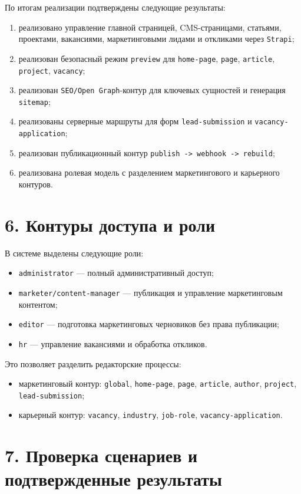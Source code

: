 \documentclass[12pt,a4paper]{article}
\begin{document}
По итогам реализации подтверждены следующие результаты:
\begin{enumerate}
  \item реализовано управление главной страницей, CMS-страницами, статьями, проектами,
  вакансиями, маркетинговыми лидами и откликами через \texttt{Strapi};
  \item реализован безопасный режим \texttt{preview} для \texttt{home-page}, \texttt{page},
  \texttt{article}, \texttt{project}, \texttt{vacancy};
  \item реализован \texttt{SEO/Open Graph}-контур для ключевых сущностей и генерация
  \texttt{sitemap};
  \item реализованы серверные маршруты для форм \texttt{lead-submission} и
  \texttt{vacancy-application};
  \item реализован публикационный контур \texttt{publish -> webhook -> rebuild};
  \item реализована ролевая модель с разделением маркетингового и карьерного контуров.
\end{enumerate}

\section*{6. Контуры доступа и роли}

В системе выделены следующие роли:
\begin{itemize}
  \item \texttt{administrator} --- полный административный доступ;
  \item \texttt{marketer/content-manager} --- публикация и управление маркетинговым контентом;
  \item \texttt{editor} --- подготовка маркетинговых черновиков без права публикации;
  \item \texttt{hr} --- управление вакансиями и обработка откликов.
\end{itemize}

Это позволяет разделить редакторские процессы:
\begin{itemize}
  \item маркетинговый контур: \texttt{global}, \texttt{home-page}, \texttt{page},
  \texttt{article}, \texttt{author}, \texttt{project}, \texttt{lead-submission};
  \item карьерный контур: \texttt{vacancy}, \texttt{industry}, \texttt{job-role},
  \texttt{vacancy-application}.
\end{itemize}

\section*{7. Проверка сценариев и подтвержденные результаты}
\end{document}
